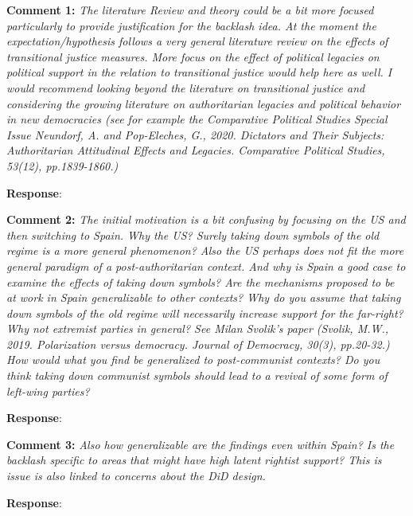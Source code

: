 \documentclass[12pt, a4paper, notitlepage]{article}
\begin{document}
\textbf{Comment 1:} \textit{The literature Review and theory could be a bit more focused particularly to provide justification for the backlash idea. At the moment the expectation/hypothesis follows a very general literature review on the effects of transitional justice measures. More focus on the effect of political legacies on political support in the relation to transitional justice would help here as well. I would recommend looking beyond the literature on transitional justice and considering the growing literature on authoritarian legacies and political behavior in new democracies (see for example the Comparative Political Studies Special Issue Neundorf, A. and Pop-Eleches, G., 2020. Dictators and Their Subjects: Authoritarian Attitudinal Effects and Legacies. Comparative Political Studies, 53(12), pp.1839-1860.)}

\textbf{Response}: {\color{red}{pending}}

\textbf{Comment 2:} \textit{The initial motivation is a bit confusing by focusing on the US and then switching to Spain. Why the US? Surely taking down symbols of the old regime is a more general phenomenon? Also the US perhaps does not fit the more general paradigm of a post-authoritarian context. And why is Spain a good case to examine the effects of taking down symbols? Are the mechanisms proposed to be at work in Spain generalizable to other contexts? Why do you assume that taking down symbols of the old regime will necessarily increase support for the far-right? Why not extremist parties in general? See Milan Svolik’s paper (Svolik, M.W., 2019. Polarization versus democracy. Journal of Democracy, 30(3), pp.20-32.) How would what you find be generalized to post-communist contexts? Do you think taking down communist symbols should lead to a revival of some form of left-wing parties?}

\textbf{Response}: {\color{red}{pending}}

\textbf{Comment 3:} \textit{Also how generalizable are the findings even within Spain? Is the backlash specific to areas that might have high latent rightist support? This is issue is also linked to concerns about the DiD design.}

\textbf{Response}: {\color{red}{pending}}
\end{document}
